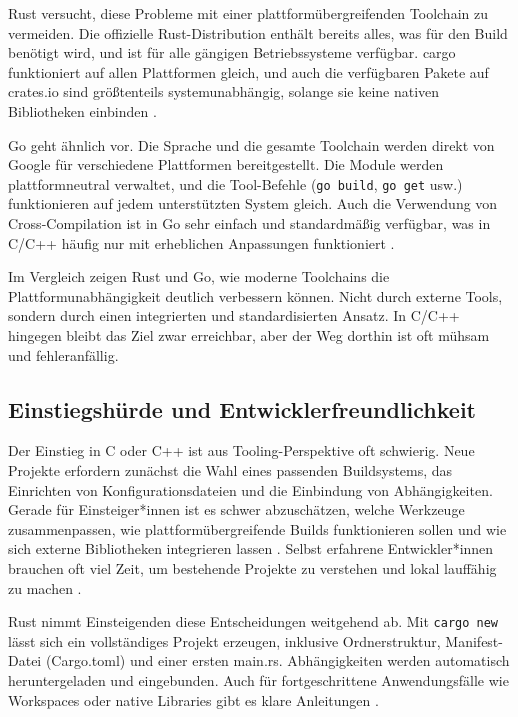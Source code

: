 Rust versucht, diese Probleme mit einer plattformübergreifenden Toolchain zu vermeiden. 
Die offizielle Rust-Distribution enthält bereits alles, was für den Build benötigt wird, 
und ist für alle gängigen Betriebssysteme verfügbar. cargo funktioniert auf allen Plattformen gleich, 
und auch die verfügbaren Pakete auf crates.io sind größtenteils systemunabhängig, 
solange sie keine nativen Bibliotheken einbinden \autocite{HelloCargoRust}.

Go geht ähnlich vor. Die Sprache und die gesamte Toolchain werden direkt von Google für verschiedene Plattformen bereitgestellt. 
Die Module werden plattformneutral verwaltet, und die Tool-Befehle (\texttt{go build}, \texttt{go get} usw.) 
funktionieren auf jedem unterstützten System gleich. Auch die Verwendung von Cross-Compilation ist in Go sehr einfach 
und standardmäßig verfügbar, was in C/C++ häufig nur mit erheblichen Anpassungen funktioniert \autocite{GoModulesReference,UsingGoModules}.

Im Vergleich zeigen Rust und Go, wie moderne Toolchains die Plattformunabhängigkeit deutlich verbessern können. 
Nicht durch externe Tools, sondern durch einen integrierten und standardisierten Ansatz. 
In C/C++ hingegen bleibt das Ziel zwar erreichbar, aber der Weg dorthin ist oft mühsam und fehleranfällig.

\subsection{Einstiegshürde und Entwicklerfreundlichkeit}
\label{subsec:Einstiegshuerde_und_Entwicklerfreundlichkeit}

Der Einstieg in C oder C++ ist aus Tooling-Perspektive oft schwierig. Neue Projekte erfordern zunächst die Wahl eines passenden Buildsystems, 
das Einrichten von Konfigurationsdateien und die Einbindung von Abhängigkeiten. Gerade für Einsteiger*innen ist es schwer abzuschätzen, 
welche Werkzeuge zusammenpassen, wie plattformübergreifende Builds funktionieren sollen und wie sich externe Bibliotheken 
integrieren lassen \autocite{SurprisinglyComplexWorld,NotesPackageManagement}. Selbst erfahrene Entwickler*innen brauchen oft viel Zeit, 
um bestehende Projekte zu verstehen und lokal lauffähig zu machen \autocite{tangUnderstandingThirdpartyLibrary2022}.

Rust nimmt Einsteigenden diese Entscheidungen weitgehend ab. Mit \texttt{cargo new} lässt sich ein vollständiges Projekt erzeugen, 
inklusive Ordnerstruktur, Manifest-Datei (Cargo.toml) und einer ersten main.rs. Abhängigkeiten werden automatisch heruntergeladen und eingebunden.
Auch für fortgeschrittene Anwendungsfälle wie Workspaces oder native Libraries gibt es klare Anleitungen \autocite{HelloCargoRust}.

